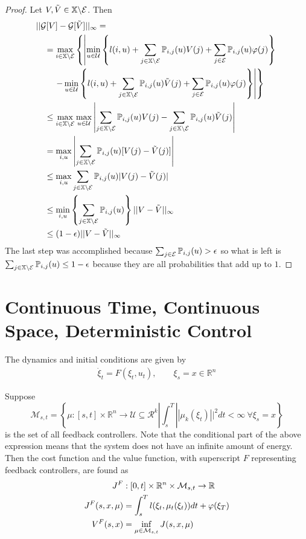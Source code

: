 \begin{proof}
Let $V,\tilde{V}\in\mathbb{X}\backslash\mathcal{E}$. Then
\begin{align*}
&||\mathcal{G}[V]-\mathcal{G}[\tilde{V}]||_\infty = \\
&\quad = \max_{i\in\mathbb{X}\backslash\mathcal{E}}\left\lbrace \left| \min_{u\in\mathcal{U}}\left\lbrace l(i,u) + \sum_{j\in\mathbb{X}\backslash\mathcal{E}}\mathbb{P}_{i,j}(u)V(j) + \sum_{j\in\mathcal{E}}\mathbb{P}_{i,j}(u)\varphi(j)\right\rbrace \right.\right. \\
&\left.\left.\qquad - \min_{u\in\mathcal{U}}\left\lbrace l(i,u) + \sum_{j\in\mathbb{X}\backslash\mathcal{E}}\mathbb{P}_{i,j}(u)\tilde{V}(j) + \sum_{j\in\mathcal{E}}\mathbb{P}_{i,j}(u)\varphi(j) \right\rbrace\right|\right\rbrace \\
&\quad\leq \max_{i\in\mathbb{X}\backslash\mathcal{E}} \max_{u\in\mathcal{U}} \left|\sum_{j\in\mathbb{X}\backslash\mathcal{E}}\mathbb{P}_{i,j}(u)V(j) - \sum_{j\in\mathbb{X}\backslash\mathcal{E}}\mathbb{P}_{i,j}(u)\tilde{V}(j)\right| \\
&\quad= \max_{i,u} \left| \sum_{j\in\mathbb{X}\backslash\mathcal{E}}\mathbb{P}_{i,j}(u)[V(j)-\tilde{V}(j)]\right| \\
&\quad\leq \max_{i,u} \sum_{j\in\mathbb{X}\backslash\mathcal{E}}\mathbb{P}_{i,j}(u)|V(j)-\tilde{V}(j)| \\
&\quad\leq \min_{i,u} \left\lbrace \sum_{j\in\mathbb{X}\backslash\mathcal{E}}\mathbb{P}_{i,j}(u)\right\rbrace ||V-\tilde{V}||_\infty \\
&\quad\leq (1-\epsilon)||V-\tilde{V}||_\infty
\end{align*}
The last step was accomplished because $\sum_{j\in\mathcal{E}}\mathbb{P}_{i,j}(u)>\epsilon$ so what is left is $\sum_{j\in\mathbb{X}\backslash\mathcal{E}}\mathbb{P}_{i,j}(u)\leq1-\epsilon$ because they are all probabilities that add up to $1$.
\end{proof}

\section{Continuous Time, Continuous Space, Deterministic Control}
The dynamics and initial conditions are given by
\begin{align}
\label{eq:ctcsdynamics}
\dot{\xi}_t = F(\xi_t,u_t), \qquad \xi_s=x\in\mathbb{R}^n
\end{align}

Suppose
$$\mathcal{M}_{s,t} = \left\lbrace\mu:[s,t]\times\mathbb{R}^n\to\mathcal{U}\subseteq\mathcal{R}^k | \int_s^T||\mu_k(\xi_t)||^2dt<\infty ~\forall \xi_s=x\right\rbrace$$
is the set of all feedback controllers. Note that the conditional part of the above expression means that the system does not have an infinite amount of energy. Then the cost function and the value function, with superscript $F$ representing feedback controllers, are found as
\begin{align*}
J^F&:[0,t]\times\mathbb{R}^n\times\mathcal{M}_{s,t}\to\mathbb{R} \\
J^F(s,x,\mu) &= \int_s^T l(\xi_t,\mu_t(\xi_t))dt + \varphi(\xi_T) \\
V^F(s,x) &= \inf_{\mu\in\mathcal{M}_{s,t}} J(s,x,\mu)
\end{align*}

